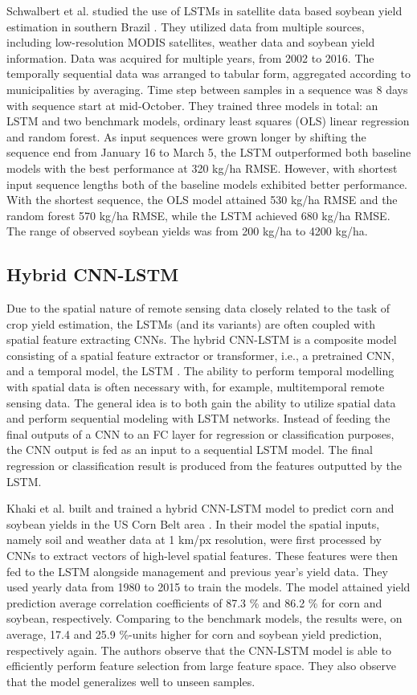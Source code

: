 Schwalbert et al. studied the use of LSTMs in satellite data based soybean yield estimation in southern Brazil \cite{Schwalbert2020}. They utilized data from multiple sources, including low-resolution MODIS satellites, weather data and soybean yield information. Data was acquired for multiple years, from 2002 to 2016. The temporally sequential data was arranged to tabular form, aggregated according to municipalities by averaging. Time step between samples in a sequence was 8 days with sequence start at mid-October. They trained three models in total: an LSTM and two benchmark models, ordinary least squares (OLS) linear regression and random forest. As input sequences were grown longer by shifting the sequence end from January 16 to March 5, the LSTM outperformed both baseline models with the best performance at 320 kg/ha RMSE. However, with shortest input sequence lengths both of the baseline models exhibited better performance. With the shortest sequence, the OLS model attained 530 kg/ha RMSE and the random forest 570 kg/ha RMSE, while the LSTM achieved 680 kg/ha RMSE. The range of observed soybean yields was from 200 kg/ha to 4200 kg/ha.


\subsection{Hybrid CNN-LSTM}
\label{subsec:cnn-lstm-review}

Due to the spatial nature of remote sensing data closely related to the task of crop yield estimation, the LSTMs (and its variants) are often coupled with spatial feature extracting CNNs. The hybrid CNN-LSTM is a composite model consisting of a spatial feature extractor or transformer, i.e., a pretrained CNN, and a temporal model, the LSTM \cite{Sainath2015}. The ability to perform temporal modelling with spatial data is often necessary with, for example, multitemporal remote sensing data. The general idea is to both gain the ability to utilize spatial data and perform sequential modeling with LSTM networks. Instead of feeding the final outputs of a CNN to an FC layer for regression or classification purposes, the CNN output is fed as an input to a sequential LSTM model. The final regression or classification result is produced from the features outputted by the LSTM.

Khaki et al. built and trained a hybrid CNN-LSTM model to predict corn and soybean yields in the US Corn Belt area \cite{Khaki2020}. In their model the spatial inputs, namely soil and weather data at 1 km/px resolution, were first processed by CNNs to extract vectors of high-level spatial features. These features were then fed to the LSTM alongside management and previous year's yield data. They used yearly data from 1980 to 2015 to train the models. The model attained yield prediction average correlation coefficients of 87.3 \% and 86.2 \% for corn and soybean, respectively. Comparing to the benchmark models, the results were, on average, 17.4 and 25.9 \%-units higher for corn and soybean yield prediction, respectively again. The authors observe that the CNN-LSTM model is able to efficiently perform feature selection from large feature space. They also observe that the model generalizes well to unseen samples.

